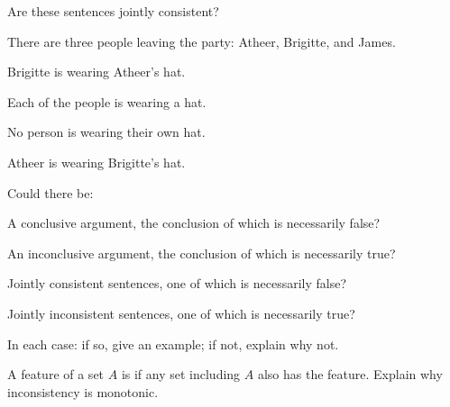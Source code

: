 \problempart Are these sentences jointly consistent?
\begin{earg}
\item There are three people leaving the party: Atheer, Brigitte, and James.
\item Brigitte is wearing Atheer's hat.
\item Each of the people is wearing a hat.
\item No person is wearing their own hat.
\item Atheer is wearing Brigitte's hat.
\end{earg}



\problempart
\label{pr.ModalityValidity}
Could there be:
\begin{earg}
\item A conclusive argument, the conclusion of which is necessarily false?
\item An inconclusive argument, the conclusion of which is necessarily true?
\item Jointly consistent sentences, one of which is necessarily false?
\item Jointly inconsistent sentences, one of which is necessarily true?
\end{earg}
In each case: if so, give an example; if not, explain why not.

\problempart A feature of a set $A$ is  if any set including $A$ also has the feature. Explain why inconsistency is monotonic.
